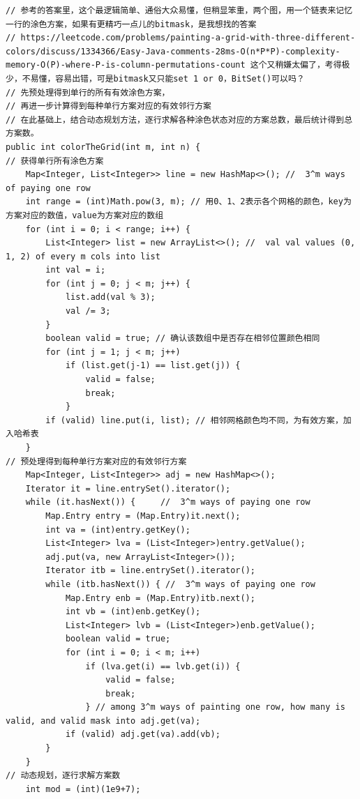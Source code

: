 \documentclass[9pt, b5paaper]{book}
\begin{document}
\begin{verbatim}
// 参考的答案里，这个最逻辑简单、通俗大众易懂，但稍显笨重，两个图，用一个链表来记忆一行的涂色方案，如果有更精巧一点儿的bitmask，是我想找的答案
// https://leetcode.com/problems/painting-a-grid-with-three-different-colors/discuss/1334366/Easy-Java-comments-28ms-O(n*P*P)-complexity-memory-O(P)-where-P-is-column-permutations-count 这个又稍嫌太偏了，考得极少，不易懂，容易出错，可是bitmask又只能set 1 or 0，BitSet()可以吗？
// 先预处理得到单行的所有有效涂色方案，
// 再进一步计算得到每种单行方案对应的有效邻行方案
// 在此基础上，结合动态规划方法，逐行求解各种涂色状态对应的方案总数，最后统计得到总方案数。
public int colorTheGrid(int m, int n) {
// 获得单行所有涂色方案
    Map<Integer, List<Integer>> line = new HashMap<>(); //  3^m ways of paying one row
    int range = (int)Math.pow(3, m); // 用0、1、2表示各个网格的颜色，key为方案对应的数值，value为方案对应的数组
    for (int i = 0; i < range; i++) {
        List<Integer> list = new ArrayList<>(); //  val val values (0, 1, 2) of every m cols into list
        int val = i;
        for (int j = 0; j < m; j++) {
            list.add(val % 3);
            val /= 3;
        }
        boolean valid = true; // 确认该数组中是否存在相邻位置颜色相同
        for (int j = 1; j < m; j++) 
            if (list.get(j-1) == list.get(j)) {
                valid = false;
                break;
            }
        if (valid) line.put(i, list); // 相邻网格颜色均不同，为有效方案，加入哈希表
    }
// 预处理得到每种单行方案对应的有效邻行方案
    Map<Integer, List<Integer>> adj = new HashMap<>();
    Iterator it = line.entrySet().iterator();
    while (it.hasNext()) {     //  3^m ways of paying one row
        Map.Entry entry = (Map.Entry)it.next();
        int va = (int)entry.getKey();
        List<Integer> lva = (List<Integer>)entry.getValue();
        adj.put(va, new ArrayList<Integer>());
        Iterator itb = line.entrySet().iterator();
        while (itb.hasNext()) { //  3^m ways of paying one row
            Map.Entry enb = (Map.Entry)itb.next(); 
            int vb = (int)enb.getKey();
            List<Integer> lvb = (List<Integer>)enb.getValue();
            boolean valid = true;
            for (int i = 0; i < m; i++) 
                if (lva.get(i) == lvb.get(i)) {
                    valid = false;
                    break;
                } // among 3^m ways of painting one row, how many is valid, and valid mask into adj.get(va);
            if (valid) adj.get(va).add(vb); 
        }
    }
// 动态规划，逐行求解方案数
    int mod = (int)(1e9+7);

\end{verbatim}
\end{document}
